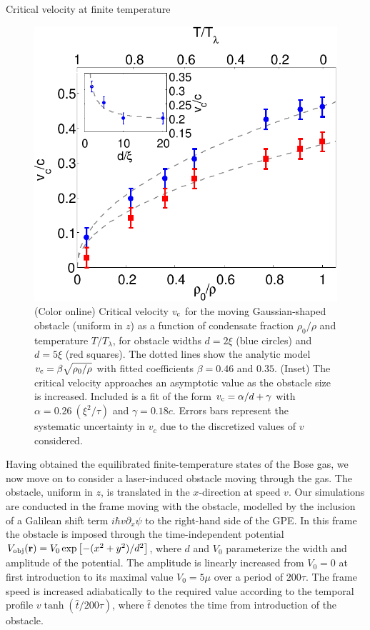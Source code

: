 \begin{chapter}{\label{cha:nonequib}Critical velocity at finite temperature}
\begin{figure}
\centering
  \includegraphics[width=0.45\linewidth]{nonequib/figures/vc-n0}
  \caption{\label{fig:vc-n0}(Color online) Critical velocity $v_{\rm c}$ for the moving Gaussian-shaped obstacle (uniform in $z$) as a function of condensate fraction $\rho_0/\rho$ and temperature $T/T_\lambda$, for obstacle widths $d=2\xi$ (blue circles) and $d=5\xi$ (red squares). The dotted lines show the analytic model $v_{\rm c}=\beta \sqrt{\rho_0/\rho}$ with fitted coefficients $\beta=0.46$ and $0.35$. (Inset) The critical velocity approaches an asymptotic value as the obstacle size is increased. Included is a fit of the form $v_{\rm c}=\alpha/d+\gamma$ with $\alpha=0.26~(\xi^2/\tau)$ and $\gamma=0.18 c$.  Errors bars represent the systematic uncertainty in $v_c$ due to the discretized values of $v$ considered.}
\end{figure}

Having obtained the equilibrated finite-temperature states of the Bose gas, we now move on to consider a laser-induced obstacle moving through the gas.  The obstacle, uniform in $z$, is translated in the $x$-direction at speed $v$.  Our simulations are conducted in the frame moving with the obstacle, modelled by the inclusion of a Galilean shift term $i \hbar v \partial_x \psi$ to the right-hand side of the GPE.  In this frame the obstacle is imposed through the time-independent potential $V_{\mathrm{obj}}{(\bf r})=V_0 \exp\left[{-(x^2+y^2)/d^2 }\right]$, where $d$ and $V_0$ parameterize the width and amplitude of the potential.  The amplitude is linearly increased from $V_0 = 0$ at first introduction to its maximal value $V_0=5\mu$ over a period of $200\tau$.   The frame speed is increased adiabatically to the required value according to the temporal profile $v \tanh(\hat{t}/200 \tau)$, where $\hat{t}$ denotes the time from introduction of the obstacle.


\end{chapter}

